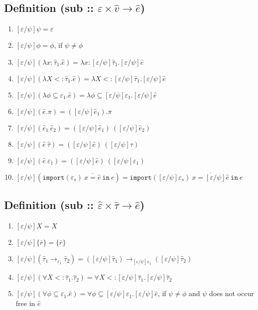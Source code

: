 \documentclass{llncs}
\newcommand{\keywadj}[1]{\mathtt{#1}}
\newcommand{\keyw}[1]{\keywadj{#1}~}
\newcommand{\kw}[1]{\keyw{ #1 }}
\newcommand{\kwa}[1]{\keywadj{ #1 }}
\begin{document}
\subsection*{Definition (sub :: $\varepsilon \times \hat v \rightarrow \hat e$)}

\begin{enumerate}
	\item $[\varepsilon/\psi]\psi = \varepsilon$
	\item $[\varepsilon/\psi]\phi = \phi$, if $\psi \neq \phi$
	\item $[\varepsilon/\psi](\lambda x: \hat \tau_1. \hat e) = \lambda x: [\varepsilon/\psi]\hat \tau_1. [\varepsilon/\psi]\hat e$
	\item $[\varepsilon/\psi](\lambda X <: \hat \tau_1. \hat e) = \lambda X <: [\varepsilon/\psi]\hat \tau_1. [\varepsilon/\psi]\hat e$
	\item $[\varepsilon/\psi](\lambda \phi \subseteq \varepsilon_1. \hat e) = \lambda \phi \subseteq [\varepsilon/\psi]\varepsilon_1. [\varepsilon/\psi]\hat e$
	\item $[\varepsilon/\psi](\hat e.\pi) = ([\varepsilon/\psi]\hat e_1).\pi$
	\item $[\varepsilon/\psi](\hat e_1~\hat e_2) = ([\varepsilon/\psi]\hat e_1)~([\varepsilon/\psi]\hat e_2)$
	\item $[\varepsilon/\psi](\hat e~\hat \tau) = ([\varepsilon/\psi]\hat e)~([\varepsilon/\psi]\hat \tau)$
	\item $[\varepsilon/\psi](\hat e~\varepsilon_1) = ([\varepsilon/\psi]\hat e) ~ ([\varepsilon/\psi]\varepsilon_1)$
	\item $[\varepsilon/\psi](\kwa{import}(\varepsilon_s)~\overline{x = \hat e}~\kw{in} e) = \kwa{import}([\varepsilon/\psi]\varepsilon_s)~\overline{x = [\varepsilon/\psi]\hat e}~\kw{in} e$
\end{enumerate}

\subsection*{Definition (sub :: $\hat \varepsilon \times \hat \tau \rightarrow \hat e$)}

\begin{enumerate}
	\item $[\varepsilon/\psi]X = X$
	\item $[\varepsilon/\psi]\{ \bar r \} = \{ \bar r \}$
	\item $[\varepsilon/\psi](\hat \tau_1 \rightarrow_{\varepsilon_1} \hat \tau_2) = ([\varepsilon/\psi]\hat \tau_1) \rightarrow_{[\varepsilon/\psi]\varepsilon_1} ([\varepsilon/\psi]\hat \tau_2)$
	\item $[\varepsilon/\psi](\forall X <: \hat \tau_1. \hat \tau_2) = \forall X <: [\varepsilon/\psi]\hat \tau_1.  [\varepsilon/\psi]\hat \tau_2$
	\item $[\varepsilon/\psi](\forall \phi \subseteq \varepsilon_1. \hat e) = \forall \phi \subseteq [\varepsilon/\psi]\varepsilon_1. [\varepsilon/\psi]\hat e$, if $\psi \neq \phi$ and $\psi$ does not occur free in $\hat e$
\end{enumerate}
\end{document}
